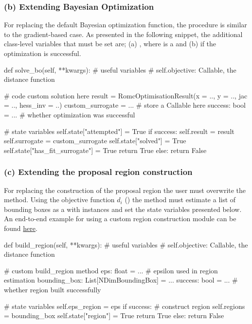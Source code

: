\documentclass[nojss]{jss}
\begin{document}
\subsubsection*{(b) Extending Bayesian Optimization}

For replacing the default Bayesian optimization function, the
procedure is similar to the gradient-based case. As presented in the
following snippet, the additional class-level variables that must be
set are; (a) , where
 is a  and (b)
 if the optimization is
successful.

\begin{Code}
def solve_bo(self, **kwargs):
    # useful variables
    # self.objective: Callable, the distance function

    # code custom solution here
    result = RomcOptimisationResult(x = .., y = .., jac = .., hess_inv = ..)
    custom_surrogate = ... # store a Callable here
    success: bool = ... # whether optimization was successful

    # state variables
    self.state["attempted"] = True
    if success:
        self.result = result
        self.surrogate = custom_surrogate
        self.state["solved"] = True
        self.state["has_fit_surrogate"] = True
        return True
    else:
        return False
\end{Code}

\subsubsection*{(c) Extending the proposal region construction}

For replacing the construction of the proposal region the user must
overwrite the  method. Using the objective function
\(d_i\) () the method must estimate a list of
bounding boxes as a  with  instances
and set the state variables presented below. An end-to-end example for
using a custom region construction module can be found
\href{https://colab.research.google.com/drive/1RzB-V1QueP1y1nyzv_VOqR1nVz3DUH3v?usp=sharing}{here}.

\begin{Code}
def build_region(self, **kwargs):
    # useful variables
    # self.objective: Callable, the distance function

    # custom build_region method
    eps: float = ... # epsilon used in region estimation
    bounding_box: List[NDimBoundingBox] = ...
    success: bool = ... # whether region built successfully

    # state variables
    self.eps_region = eps
    if success:
        # construct region
        self.regions = bounding_box
        self.state["region"] = True
        return True
    else:
        return False
\end{Code}
\end{document}
